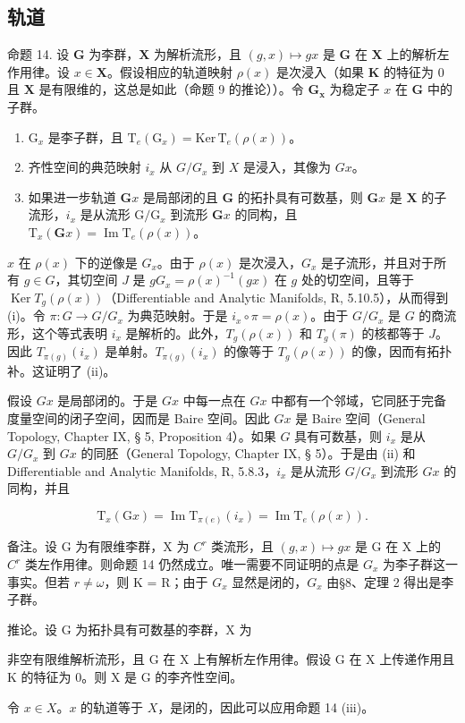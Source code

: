 \subsection{轨道}

命题 14. 设 \(\mathbf{G}\) 为李群，\(\mathbf{X}\) 为解析流形，且 \((g,x)\mapsto gx\) 是 \(\mathbf{G}\) 在 \(\mathbf{X}\) 上的解析左作用律。设 \(x\in \mathbf{X}\)。假设相应的轨道映射 \(\rho (x)\) 是次浸入（如果 \(\mathbf{K}\) 的特征为 0 且 \(\mathbf{X}\) 是有限维的，这总是如此（命题 9 的推论））。令 \(\mathbf{G}_{\mathbf{x}}\) 为稳定子 \(x\) 在 \(\mathbf{G}\) 中的子群。

\begin{enumerate}
\def\labelenumi{(\roman{enumi})}
\item
  \(\mathrm{G}_x\) 是李子群，且 \(\mathrm{T}_e(\mathrm{G}_x) = \mathrm{Ker}\, \mathrm{T}_e(\rho(x))\)。
\item
  齐性空间的典范映射 \(i_x\) 从 \(G / G_x\) 到 \(X\) 是浸入，其像为 \(Gx\)。
\item
  如果进一步轨道 \(\mathbf{G}x\) 是局部闭的且 \(\mathbf{G}\) 的拓扑具有可数基，则 \(\mathbf{G}x\) 是 \(\mathbf{X}\) 的子流形，\(i_x\) 是从流形 \(\mathrm{G} / \mathrm{G}_x\) 到流形 \(\mathbf{G}x\) 的同构，且 \(\mathrm{T}_x(\mathbf{G}x) = \operatorname{Im} \mathrm{T}_e(\rho(x))\)。
\end{enumerate}

\(x\) 在 \(\rho(x)\) 下的逆像是 \(G_x\)。由于 \(\rho(x)\) 是次浸入，\(G_x\) 是子流形，并且对于所有 \(g \in G\)，其切空间 \(J\) 是 \(gG_x = \rho(x)^{-1}(gx)\) 在 \(g\) 处的切空间，且等于 \(\operatorname{Ker} T_g(\rho(x))\)（Differentiable and Analytic Manifolds, R, 5.10.5），从而得到 (i)。令 \(\pi: G \to G/G_x\) 为典范映射。于是 \(i_x \circ \pi = \rho(x)\)。由于 \(G/G_x\) 是 \(G\) 的商流形，这个等式表明 \(i_x\) 是解析的。此外，\(T_g(\rho(x))\) 和 \(T_g(\pi)\) 的核都等于 \(J\)。因此 \(T_{\pi(g)}(i_x)\) 是单射。\(T_{\pi(g)}(i_x)\) 的像等于 \(T_g(\rho(x))\) 的像，因而有拓扑补。这证明了 (ii)。

假设 \(Gx\) 是局部闭的。于是 \(Gx\) 中每一点在 \(Gx\) 中都有一个邻域，它同胚于完备度量空间的闭子空间，因而是 Baire 空间。因此 \(Gx\) 是 Baire 空间（General Topology, Chapter IX, § 5, Proposition 4）。如果 \(G\) 具有可数基，则 \(i_x\) 是从 \(G / G_x\) 到 \(Gx\) 的同胚（General Topology, Chapter IX, § 5）。于是由 (ii) 和 Differentiable and Analytic Manifolds, R, 5.8.3，\(i_x\) 是从流形 \(G / G_x\) 到流形 \(Gx\) 的同构，并且

\[
\mathrm{T} _ {x} (\mathrm{G} x) = \operatorname{Im} \mathrm{T} _ {\pi (e)} (i _ {x}) = \operatorname{Im} \mathrm{T} _ {e} (\rho (x)).
\]

备注。设 G 为有限维李群，X 为 \(C^{r}\) 类流形，且 \((g, x) \mapsto gx\) 是 G 在 X 上的 \(C^{r}\) 类左作用律。则命题 14 仍然成立。唯一需要不同证明的点是 \(G_{x}\) 为李子群这一事实。但若 \(r \neq \omega\)，则 K = R；由于 \(G_{x}\) 显然是闭的，\(G_{x}\) 由§8、定理 2 得出是李子群。

推论。设 G 为拓扑具有可数基的李群，X 为

非空有限维解析流形，且 G 在 X 上有解析左作用律。假设 G 在 X 上传递作用且 K 的特征为 0。则 X 是 G 的李齐性空间。

令 \(x \in X\)。\(x\) 的轨道等于 \(X\)，是闭的，因此可以应用命题 14 (iii)。

